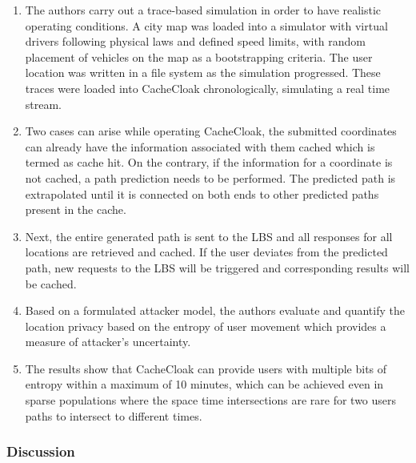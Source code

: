 \begin{enumerate}

	\item The authors carry out a trace-based simulation in order to have realistic operating
	 conditions. A city map was loaded into a simulator with virtual drivers following physical laws
	 and defined speed limits, with random placement of vehicles on the map as a bootstrapping
	 criteria. The user location was written in a file system as the simulation progressed. These
	 traces were loaded into CacheCloak chronologically, simulating a real time stream.
	 
	 \item Two cases can arise while operating CacheCloak, the submitted coordinates can already
	 have the information associated with them cached which is termed as cache hit. On the contrary, 
	 if the information for a coordinate is not cached, a path prediction needs to be performed. The
	 predicted path is extrapolated until it is connected on both ends to other predicted paths 
	 present in the cache. 
	 
	 \item Next, the entire generated path is sent to the LBS and all responses for all locations
	 are retrieved and cached. If the user deviates from the predicted path, new requests to the 
	 LBS will be triggered and corresponding results will be cached. 
	 
	 \item Based on a formulated attacker model, the authors evaluate and quantify the location 
	 privacy based on the entropy of user movement which provides a measure of attacker's uncertainty. 
	 
	 \item The results show that CacheCloak can provide users with multiple bits of entropy within 
	 a maximum of 10 minutes, which can be achieved even in sparse populations where the space time 
	 intersections are rare for two users paths to intersect to different times.  
		
\end{enumerate}

\subsubsection*{Discussion} 

